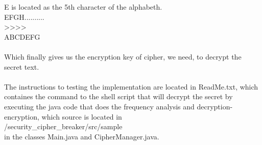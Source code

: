 \documentclass[12pt,a4paper]{article}
\begin{document}
E is located as the 5th character of the alphabeth.\\
EFGH..........\\
\textgreater\textgreater\textgreater\textgreater\\
ABCDEFG\\
\\
Which finally gives us the encryption key of cipher, we need, to decrypt the secret text.\\
\\
The instructions to testing the implementation are located in ReadMe.txt, which containes the command to the shell script that will decrypt the secret by\\
executing the java code that does the frequency analysis and decryption-encryption, which source is located in\\
/security\_cipher\_breaker/src/sample \\
in the classes Main.java and CipherManager.java.\\
\end{document}
